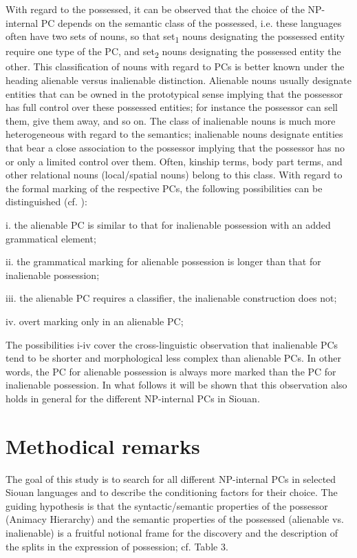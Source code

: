 \documentclass[output=paper]{LSP/langsci}
\begin{document}
With regard to the possessed, it can be observed that the choice of the NP-internal PC depends on the semantic class of the possessed, i.e. these languages often have two sets of nouns, so that set\textsubscript{1} nouns designating the possessed entity require one type of the PC, and set\textsubscript{2} nouns designating the possessed entity the other. This classification of nouns with regard to PCs is better known under the heading alienable versus inalienable distinction. Alienable nouns usually designate entities that can be owned in the prototypical sense implying that the possessor has full control over these possessed entities; for instance the possessor can sell them, give them away, and so on. The class of inalienable nouns is much more heterogeneous with regard to the semantics; inalienable nouns designate entities that bear a close association to the possessor implying that the possessor has no or only a limited control over them. Often, kinship terms, body part terms, and other relational nouns (local/spatial nouns) belong to this class. 
With regard to the formal marking of the respective PCs, the following possibilities can be distinguished (cf. \citealt[286-290]{Dixon2010}):

\vspace{1em}
i.	the alienable PC is similar to that for inalienable possession with an added grammatical element;

ii.	the grammatical marking for alienable possession is longer than that for inalienable possession;

iii.	the alienable PC requires a classifier, the inalienable construction does not;

iv.	overt marking only in an alienable PC;
\vspace{1em}

The possibilities i-iv cover the cross-linguistic observation that inalienable PCs tend to be shorter and morphological less complex than alienable PCs. In other words, the PC for alienable possession is always more marked than the PC for inalienable possession. In what follows it will be shown that this observation also holds in general for the different NP-internal PCs in Siouan.

\section{Methodical remarks}

The goal of this study is to search for all different NP-internal PCs in selected Siouan languages and to describe the conditioning factors for their choice. The guiding hypothesis is that the syntactic/semantic properties of the possessor (Animacy Hierarchy) and the semantic properties of the possessed (alienable vs. inalienable) is a fruitful notional frame for the discovery and the description of the splits in the expression of possession; cf. Table 3. 
	
\end{document}
